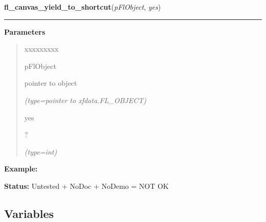     \label{xformslib:flcanvas:fl_canvas_yield_to_shortcut}

    \vspace{0.5ex}

\hspace{.8\funcindent}\begin{boxedminipage}{\funcwidth}

    \raggedright \textbf{fl\_canvas\_yield\_to\_shortcut}(\textit{pFlObject}, \textit{yes})

    \vspace{-1.5ex}

    \rule{\textwidth}{0.5\fboxrule}
\setlength{\parskip}{2ex}
\setlength{\parskip}{1ex}
      \textbf{Parameters}
      \vspace{-1ex}

      \begin{quote}
        \begin{Ventry}{xxxxxxxxx}

          \item[pFlObject]

          pointer to object

            {\it (type=pointer to xfdata.FL\_OBJECT)}

          \item[yes]

          ?

            {\it (type=int)}

        \end{Ventry}

      \end{quote}

\textbf{Example:} 

\textbf{Status:} Untested + NoDoc + NoDemo = NOT OK



    \end{boxedminipage}



  \subsection{Variables}

